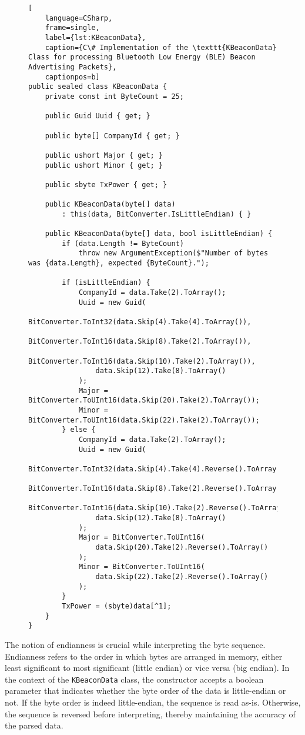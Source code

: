 \begin{figure}[H]
\begin{lstlisting}[
	language=CSharp, 
	frame=single, 
	label={lst:KBeaconData},
	caption={C\# Implementation of the \texttt{KBeaconData} Class for processing Bluetooth Low Energy (BLE) Beacon Advertising Packets}, 
	captionpos=b] 
public sealed class KBeaconData {
	private const int ByteCount = 25;

	public Guid Uuid { get; }

	public byte[] CompanyId { get; }

	public ushort Major { get; }
	public ushort Minor { get; }

	public sbyte TxPower { get; }

	public KBeaconData(byte[] data) 
		: this(data, BitConverter.IsLittleEndian) { }

	public KBeaconData(byte[] data, bool isLittleEndian) {
		if (data.Length != ByteCount)
			throw new ArgumentException($"Number of bytes was {data.Length}, expected {ByteCount}.");

		if (isLittleEndian) {
			CompanyId = data.Take(2).ToArray();
			Uuid = new Guid(
				BitConverter.ToInt32(data.Skip(4).Take(4).ToArray()),
				BitConverter.ToInt16(data.Skip(8).Take(2).ToArray()),
				BitConverter.ToInt16(data.Skip(10).Take(2).ToArray()),
				data.Skip(12).Take(8).ToArray()
			);
			Major = BitConverter.ToUInt16(data.Skip(20).Take(2).ToArray());
			Minor = BitConverter.ToUInt16(data.Skip(22).Take(2).ToArray());
		} else {
			CompanyId = data.Take(2).ToArray();
			Uuid = new Guid(
				BitConverter.ToInt32(data.Skip(4).Take(4).Reverse().ToArray()),
				BitConverter.ToInt16(data.Skip(8).Take(2).Reverse().ToArray()),
				BitConverter.ToInt16(data.Skip(10).Take(2).Reverse().ToArray()),
				data.Skip(12).Take(8).ToArray()
			);
			Major = BitConverter.ToUInt16(
				data.Skip(20).Take(2).Reverse().ToArray()
			);
			Minor = BitConverter.ToUInt16(
				data.Skip(22).Take(2).Reverse().ToArray()
			);
		}
		TxPower = (sbyte)data[^1];
	}
}
\end{lstlisting}
\end{figure}
The notion of endianness is crucial while interpreting the byte sequence.
Endianness refers to the order in which bytes are arranged in memory, either least significant to most significant (little endian) or vice versa (big endian)\cite{EndiannessMDNWeb2023}.
In the context of the \texttt{KBeaconData} class, the constructor accepts a boolean parameter that indicates whether the byte order of the data is little-endian or not. If the byte order is indeed little-endian, the sequence is read as-is. Otherwise, the sequence is reversed before interpreting, thereby maintaining the accuracy of the parsed data.
